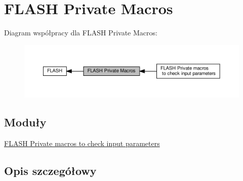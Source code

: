 \hypertarget{group___f_l_a_s_h___private___macros}{}\section{F\+L\+A\+SH Private Macros}
\label{group___f_l_a_s_h___private___macros}
Diagram współpracy dla F\+L\+A\+SH Private Macros\+:\nopagebreak
\begin{figure}[H]
\begin{center}
\leavevmode
\includegraphics[width=350pt]{group___f_l_a_s_h___private___macros}
\end{center}
\end{figure}
\subsection*{Moduły}
\begin{DoxyCompactItemize}
\item 
\hyperlink{group___f_l_a_s_h___i_s___f_l_a_s_h___definitions}{F\+L\+A\+S\+H Private macros to check input parameters}
\end{DoxyCompactItemize}


\subsection{Opis szczegółowy}
